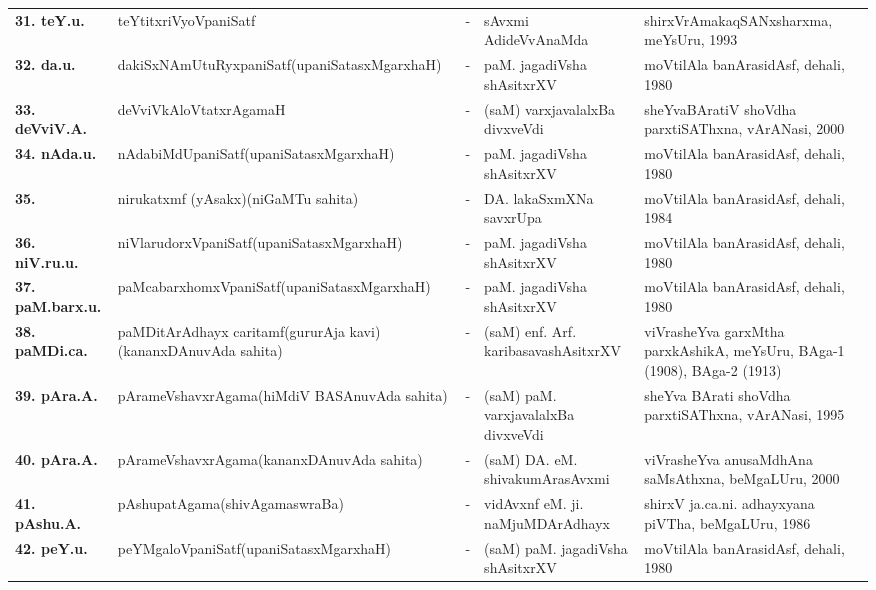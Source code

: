 {\begin{longtable}{@{}lp{5cm}cp{5cm}<{\raggedright}p{3cm}<{\raggedright}@{}}
{\bf 31. teY.u.} & teYtitxriVyoVpaniSatf &-& sAvxmi AdideVvAnaMda & shirxVrAmakaqSANxsharxma, meYsUru, 1993\\
{\bf 32. da.u.} & dakiSxNAmUtuRyxpaniSatf\newline (upaniSatasxMgarxhaH) &-& paM. jagadiVsha shAsitxrXV & moVtilAla banArasidAsf, dehali, 1980\\
{\bf 33. deVviV.A.} & deVviVkAloVtatxrAgamaH &-& (saM) varxjavalalxBa divxveVdi & sheYvaBAratiV shoVdha parxtiSAThxna, vArANasi, 2000\\
{\bf 34. nAda.u.} & nAdabiMdUpaniSatf\newline (upaniSatasxMgarxhaH) &-& paM. jagadiVsha shAsitxrXV & moVtilAla banArasidAsf, dehali, 1980\\
{\bf 35. } & nirukatxmf (yAsakx)\newline (niGaMTu sahita) &-& DA. lakaSxmXNa savxrUpa & moVtilAla banArasidAsf, dehali, 1984\\
{\bf 36. niV.ru.u.} & niVlarudorxVpaniSatf\newline (upaniSatasxMgarxhaH) &-& paM. jagadiVsha shAsitxrXV & moVtilAla banArasidAsf, dehali, 1980\\
{\bf 37. paM.barx.u.} & paMcabarxhomxVpaniSatf\newline (upaniSatasxMgarxhaH) &-& paM. jagadiVsha shAsitxrXV & moVtilAla banArasidAsf, dehali, 1980\\
{\bf 38. paMDi.ca.} & paMDitArAdhayx caritamf\newline (gururAja kavi)\newline (kananxDAnuvAda sahita) &-& (saM) enf. Arf. karibasavashAsitxrXV & viVrasheYva garxMtha parxkAshikA, meYsUru, BAga-1 (1908), BAga-2 (1913)\\
{\bf 39. pAra.A.} & pArameVshavxrAgama\newline (hiMdiV BASAnuvAda sahita) &-& (saM) paM. varxjavalalxBa divxveVdi & sheYva BArati shoVdha parxtiSAThxna, vArANasi, 1995\\
{\bf 40. pAra.A.} & pArameVshavxrAgama\newline (kananxDAnuvAda sahita) &-& (saM) DA. eM. shivakumArasAvxmi & viVrasheYva anusaMdhAna saMsAthxna, beMgaLUru, 2000\\
{\bf 41. pAshu.A.} & pAshupatAgama\newline (shivAgamaswraBa) &-& vidAvxnf eM. ji. naMjuMDArAdhayx & shirxV ja.ca.ni. adhayxyana piVTha, beMgaLUru, 1986\\
{\bf 42. peY.u.} & peYMgaloVpaniSatf\newline (upaniSatasxMgarxhaH) &-& (saM) paM. jagadiVsha shAsitxrXV & moVtilAla banArasidAsf, dehali, 1980\\

\end{longtable}}
